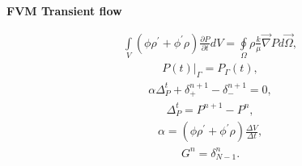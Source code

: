 \documentclass[a4paper,12pt]{extreport}
\begin{document}
\begin{multicols}{2}
\columnbreak
\begin{center}
{\large \textbf{FVM Transient flow}}
\end{center}
%
\begin{eqnarray}
\label{eq:conductivity_integral}
\int \limits_{V} \left( \phi \rho^\prime + \phi^\prime \rho \right) \frac{\partial P}{\partial t} d V = \oint \limits_{\Omega} \rho \frac{k}{\mu} \vec{\nabla}P d\vec{\Omega},
\end{eqnarray}
%
\begin{eqnarray}
\label{eq:conductivity_bound}
P\left(t\right) \Big|_\Gamma = P_\Gamma\left(t\right),
\end{eqnarray}
%
\begin{eqnarray}
\label{eq:conductivity_num}
\alpha \Delta^{t}_{P} + \delta_{+}^{n+1} - \delta_{-}^{n+1} = 0,
\end{eqnarray}
%
\begin{eqnarray}
\label{eq:delta_P_t_num}
\Delta^{t}_{P} = P^{n+1} - P^{n},
\end{eqnarray}
%
\begin{eqnarray}
\label{eq:alpha}
\alpha = \left( \phi \rho^\prime + \phi^\prime \rho \right) \frac{\Delta V}{\Delta t},
\end{eqnarray}
%
\begin{eqnarray}
\label{eq:Consumption_conductivity_integral}
G^n = \delta_{N-1}^{n}.
\end{eqnarray}
\end{multicols}

\vspace{1.cm}
\end{document}
